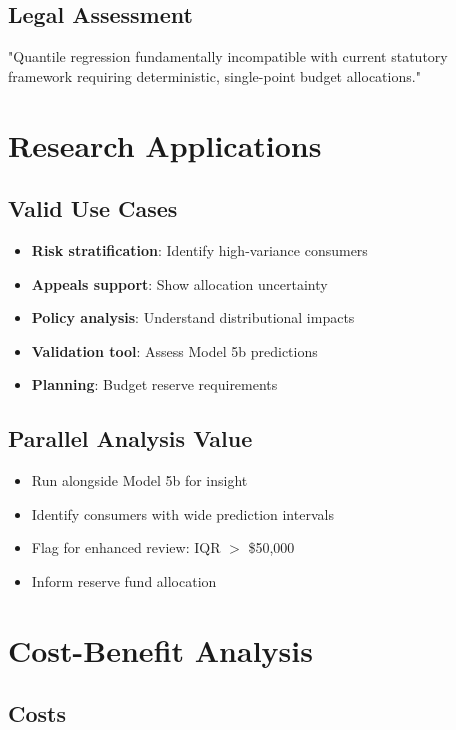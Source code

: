 \subsection{Legal Assessment}

"Quantile regression fundamentally incompatible with current statutory framework requiring deterministic, single-point budget allocations."

\section{Research Applications}

\subsection{Valid Use Cases}

\begin{itemize}
    \item \textbf{Risk stratification}: Identify high-variance consumers
    \item \textbf{Appeals support}: Show allocation uncertainty
    \item \textbf{Policy analysis}: Understand distributional impacts
    \item \textbf{Validation tool}: Assess Model 5b predictions
    \item \textbf{Planning}: Budget reserve requirements
\end{itemize}

\subsection{Parallel Analysis Value}

\begin{itemize}
    \item Run alongside Model 5b for insight
    \item Identify consumers with wide prediction intervals
    \item Flag for enhanced review: IQR $>$ \$50,000
    \item Inform reserve fund allocation
\end{itemize}

\section{Cost-Benefit Analysis}

\subsection{Costs}

